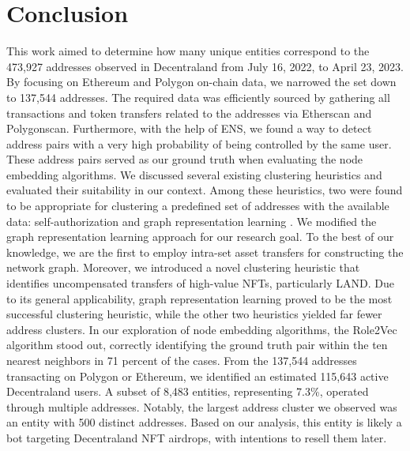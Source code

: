 \documentclass[12pt,a4paper,titlepage,oneside,english]{article}
\begin{document}
\section{Conclusion}
This work aimed to determine how many unique entities correspond to the 473,927 addresses observed in Decentraland from July 16, 2022, to April 23, 2023. \newline
By focusing on Ethereum and Polygon on-chain data, we narrowed the set down to 137,544 addresses. The required data was efficiently sourced by gathering all transactions and token transfers related to the addresses via Etherscan and Polygonscan. Furthermore, with the help of ENS, we found a way to detect address pairs with a very high probability of being controlled by the same user. These address pairs served as our ground truth when evaluating the node embedding algorithms. \newline
We discussed several existing clustering heuristics and evaluated their suitability in our context. Among these heuristics, two were found to be appropriate for clustering a predefined set of addresses with the available data: self-authorization \citep{FV:17} and graph representation learning \citep{Beres2020}. We modified the graph representation learning approach for our research goal. %
To the best of our knowledge, we are the first to employ intra-set asset transfers for constructing the network graph. Moreover, we introduced a novel clustering heuristic that identifies uncompensated transfers of high-value NFTs, particularly LAND. \newline
Due to its general applicability, graph representation learning proved to be the most successful clustering heuristic, while the other two heuristics yielded far fewer address clusters. In our exploration of node embedding algorithms, the Role2Vec algorithm stood out, correctly identifying the ground truth pair within the ten nearest neighbors in 71 percent of the cases. \newline
From the 137,544 addresses transacting on Polygon or Ethereum, we identified an estimated 115,643 active Decentraland users. A subset of 8,483 entities, representing 7.3\%, operated through multiple addresses. Notably, the largest address cluster we observed was an entity with 500 distinct addresses. Based on our analysis, this entity is likely a bot targeting Decentraland NFT airdrops, with intentions to resell them later. \newline
\end{document}

